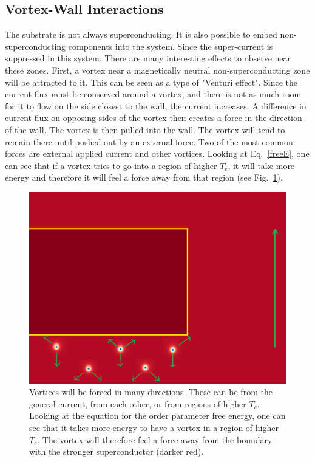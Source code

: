 \subsection{Vortex-Wall Interactions}
The substrate is not always superconducting. It is also possible to embed non-superconducting components into the system. Since the super-current is suppressed in this system, There are many interesting effects to observe near these zones. First, a vortex near a magnetically neutral non-superconducting zone will be attracted to it. This can be seen as a type of "Venturi effect". Since the current flux must be conserved around a vortex, and there is not as much room for it to flow on the side closest to the wall, the current increases. A difference in current flux on opposing sides of the vortex then creates a force in the direction of the wall. The vortex is then pulled into the wall. The vortex will tend to remain there until pushed out by an external force. Two of the most common forces are external applied current and other vortices. Looking at Eq.~\ref{freeE}, one can see that if a vortex tries to go into a region of higher $T_c$, it will take more energy and therefore it will feel a force away from that region (see Fig.~\ref{forces}).

\begin{figure}[htbp]
\begin{center}
\includegraphics[scale=.50]{forces.png}
\caption{Vortices will be forced in many directions. These can be from the general current, from each other, or from regions of higher $T_c$. Looking at the equation for the order parameter free energy, one can see that it takes more energy to have a vortex in a region of higher $T_c$. The vortex will therefore feel a force away from the boundary with the stronger superconductor (darker red).}
\label{forces}
\end{center}
\end{figure}


